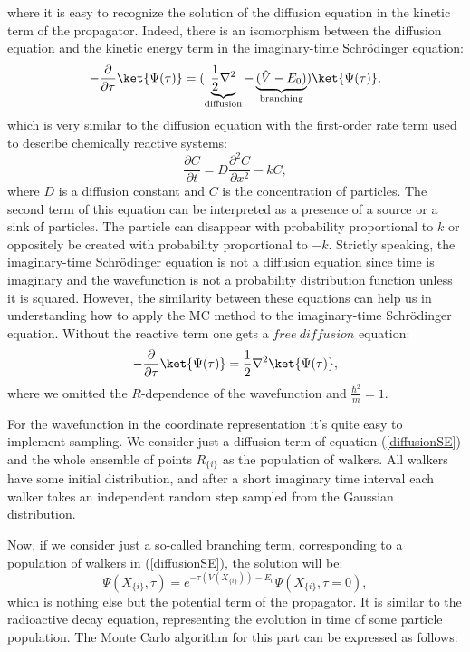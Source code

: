\documentclass[twoside,english]{uiofysmaster}
\begin{document}
where it is easy to recognize the solution of the diffusion equation in
the kinetic term of the propagator. Indeed, there is an isomorphism
between the diffusion equation and the kinetic energy term in the
imaginary-time Schr\"{o}dinger equation:
\begin{equation}\label{diffusionSE}
-\frac{\partial}{\partial \tau} \ket{\Psi(\tau)}= (\underbrace{\frac{1}{2}\nabla^2}_{\text{diffusion}} - \underbrace{(\hat{V} -E_0)}_{\text{branching}}) \ket{\Psi(\tau)},
\end{equation}
which is very similar to the diffusion equation with the first-order rate term used to describe  chemically reactive systems:
\begin{equation}\label{classdiffeq}
\frac{\partial C}{\partial t} = D\frac{\partial^2 C}{\partial x^2} - kC,
\end{equation}
where $D$ is a diffusion constant and $C$ is the concentration of particles. The second term of this equation can be interpreted as a presence of a source or a sink of particles. The particle can disappear with probability proportional to $k$ or oppositely be created with probability proportional to $-k$.
Strictly speaking, the imaginary-time Schr\"{o}dinger equation is not a diffusion equation since time is imaginary and the wavefunction is not a probability distribution function unless it is squared. However, the similarity between these equations can help us in  understanding how to apply the MC method to the imaginary-time Schr\"{o}dinger equation.
Without the reactive term one gets a $free\ diffusion$ equation:
\begin{equation}
-\frac{\partial}{\partial \tau} \ket{\Psi(\tau)}= \frac{1}{2}\nabla^2 \ket{\Psi(\tau)},
\end{equation}
where we omitted the $R$-dependence of the wavefunction and $\frac{\hbar^2}{m} = 1$. 

For the wavefunction in the coordinate representation it's quite easy
to implement sampling. We consider just a diffusion term of equation
(\ref{diffusionSE}) and the whole ensemble of points $R_{\{i\}}$ as
the population of walkers. All walkers have some initial distribution,
and after a short imaginary time interval each walker takes an
independent random step sampled from the Gaussian distribution.

Now, if we consider just a so-called branching term, corresponding to a population of walkers in (\ref{diffusionSE}), the solution will be:
\begin{equation}\label{branchingsol}
\Psi(X_{\{i\}}, \tau) = e^{-\tau(V(X_{\{i\}})) - E_0}\Psi(X_{\{i\}}, \tau=0),
\end{equation}
which is nothing else but the potential term of the propagator. It is similar to the radioactive decay equation, representing the evolution in time of some particle population. The Monte Carlo algorithm for this part can be expressed as  follows: 
\end{document}
